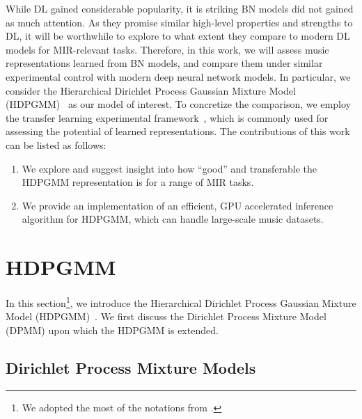 \documentclass{article}
\begin{document}
While DL gained considerable popularity, it is striking BN models did not gained as much attention. As they promise similar high-level properties and strengths to DL, it will be worthwhile to explore to what extent they compare to modern DL models for MIR-relevant tasks. Therefore, in this work, we will assess music representations learned from BN models, and compare them under similar experimental control with modern deep neural network models.
In particular, we consider the Hierarchical Dirichlet Process Gaussian Mixture Model (HDPGMM)~\cite{DBLP:journals/jmlr/WangPB11,DBLP:conf/ismir/YoshiiG09,doi:10.1198/016214506000000302} as our model of interest.
To concretize the comparison, we employ the transfer learning experimental framework~\cite{DBLP:journals/nca/KimULH20, DBLP:conf/ismir/ChoiFSC17, DBLP:conf/ismir/DielemanBS11}, which is commonly used for assessing the potential of learned representations. The contributions of this work can be listed as follows:
\begin{enumerate}[noitemsep]
    \item We explore and suggest insight into how ``good'' and transferable the HDPGMM representation is for a range of MIR tasks.
    \item We provide an implementation of an efficient, GPU accelerated inference algorithm for HDPGMM, which can handle large-scale music datasets.
\end{enumerate}


\section{HDPGMM}\label{sec:hdpgmm}

In this section\footnote{We adopted the most of the notations from \cite{DBLP:journals/jmlr/WangPB11, bishop2006pattern}.}, we introduce the Hierarchical Dirichlet Process Gaussian Mixture Model (HDPGMM)~\cite{DBLP:conf/ismir/HoffmanBC08, doi:10.1198/016214506000000302}. We first discuss the Dirichlet Process Mixture Model (DPMM) upon which the HDPGMM is extended.

\subsection{Dirichlet Process Mixture Models}\label{sec:hdpgmm:dpmm}
\end{document}
